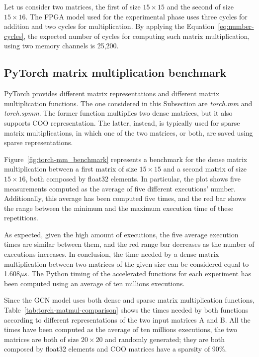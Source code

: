Let us consider two matrices, the first of size $15\times15$ and the second of size $15\times16$.
The FPGA model used for the experimental phase uses three cycles for addition and two cycles for multiplication.
By applying the Equation~\ref{eq:number-cycles}, the expected number of cycles for computing such matrix multiplication, using two memory channels is 25,200.

\subsection{PyTorch matrix multiplication benchmark}
\label{subsec:pytorch-matmul-bench}%

PyTorch provides different matrix representations and different matrix multiplication functions.
The one considered in this Subsection are \textit{torch.mm} and \textit{torch.spmm}.
The former function multiplies two dense matrices, but it also supports COO representation.
The latter, instead, is typically used for sparse matrix multiplications, in which one of the two matrices, or both, are saved using sparse representations.

Figure~\ref{fig:torch-mm_benchmark} represents a benchmark for the dense matrix multiplication between a first matrix of size $15 \times 15$ and a second matrix of size $15 \times 16$, both composed by float32 elements.
In particular, the plot shows five measurements computed as the average of five different executions' number.
Additionally, this average has been computed five times, and the red bar shows the range between the minimum and the maximum execution time of these repetitions.

As expected, given the high amount of executions, the five average execution times are similar between them, and the red range bar decreases as the number of executions increases.
In conclusion, the time needed by a dense matrix multiplication between two matrices of the given size can be considered equal to 1.608$\mu s$.
The Python timing of the accelerated functions for each experiment has been computed using an average of ten millions executions.

Since the GCN model uses both dense and sparse matrix multiplication functions, Table~\ref{tab:torch-matmul-comparison} shows the times needed by both functions according to different representations of the two input matrices A and B\@.
All the times have been computed as the average of ten millions executions, the two matrices are both of size $20 \times 20$ and randomly generated; they are both composed by float32 elements and COO matrices have a sparsity of 90\%.

